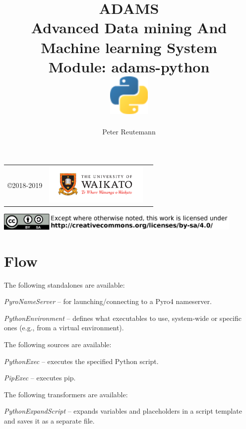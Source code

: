 \documentclass[a4paper]{book}
\title{
  \textbf{ADAMS} \\
  {\Large \textbf{A}dvanced \textbf{D}ata mining \textbf{A}nd \textbf{M}achine
  learning \textbf{S}ystem} \\
  {\Large Module: adams-python} \\
  \vspace{1cm}
  \includegraphics[width=2cm]{images/python-module.png} \\
}
\author{
  Peter Reutemann
}
\begin{document}
\begin{titlepage}
\maketitle

\thispagestyle{empty}
\center
\begin{table}[b]
	\begin{tabular}{c l l}
		\parbox[c][2cm]{2cm}{\copyright 2018-2019} &
		\parbox[c][2cm]{5cm}{\includegraphics[width=5cm]{images/coat_of_arms.pdf}}
	\end{tabular}
	\includegraphics[width=12cm]{images/cc.png} \\
\end{table}

\end{titlepage}

\tableofcontents

\chapter{Flow}

The following standalones are available:
\begin{tight_itemize}
  \item \textit{PyroNameServer} -- for launching/connecting to a Pyro4\cite{pyro4} nameserver.
  \item \textit{PythonEnvironment} -- defines what executables to use, system-wide
  or specific ones (e.g., from a virtual environment).
\end{tight_itemize}

The following sources are available:
\begin{tight_itemize}
  \item \textit{PythonExec} -- executes the specified Python script.
  \item \textit{PipExec} -- executes pip.
\end{tight_itemize}

The following transformers are available:
\begin{tight_itemize}
  \item \textit{PythonExpandScript} -- expands variables and placeholders in a
  script template and saves it as a separate file.
\end{tight_itemize}



\end{document}
